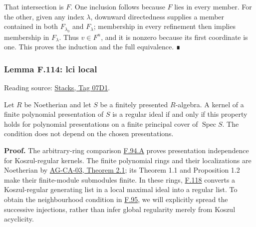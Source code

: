 \documentclass[11pt,a4paper,openany]{report}
\begin{document}
That intersection is \(F\). One inclusion follows because \(F\) lies in every member. For the other, given any index \(\lambda\), downward directedness supplies a member contained in both \(F_{\lambda_0}\) and \(F_\lambda\); membership in every refinement then implies membership in \(F_\lambda\). Thus \(v\in F^n\), and it is nonzero because its first coordinate is one. This proves the induction and the full equivalence. ∎

\label{AG-RG-S05-more-algebra-lemma-lci-local}

\subsubsection{Lemma F.114: lci local}\label{AG-RG-S05-lemma-f.114-lci-local}

Reading source: \href{https://stacks.math.columbia.edu/tag/07D1}{Stacks, Tag 07D1}.

Let \(R\) be Noetherian and let \(S\) be a finitely presented \(R\)-algebra. A kernel of a finite polynomial presentation of \(S\) is a regular ideal if and only if this property holds for polynomial presentations on a finite principal cover of \(\operatorname{Spec}S\). The condition does not depend on the chosen presentations.

\textbf{Proof.} The arbitrary-ring comparison \hyperref[AG-RG-S05-more-algebra-lemma-lci-presentation-independent]{F.94.A} proves presentation independence for Koszul-regular kernels. The finite polynomial rings and their localizations are Noetherian by \href{https://github.com/KokunoYumeto/open-math-courses/blob/d02d0a3669f42579db037cd44de1d113fdd770a1/docs/courses/AG-CA/src/noetherian-and-artinian-rings.md}{AG-CA-03, Theorem 2.1}; its Theorem 1.1 and Proposition 1.2 make their finite-module submodules finite. In these rings, \hyperref[AG-RG-S05-more-algebra-lemma-noetherian-finite-all-equivalent]{F.118} converts a Koszul-regular generating list in a local maximal ideal into a regular list. To obtain the neighbourhood condition in \hyperref[AG-RG-S05-more-algebra-definition-regular-ideal]{F.95}, we will explicitly spread the successive injections, rather than infer global regularity merely from Koszul acyclicity.
\end{document}
